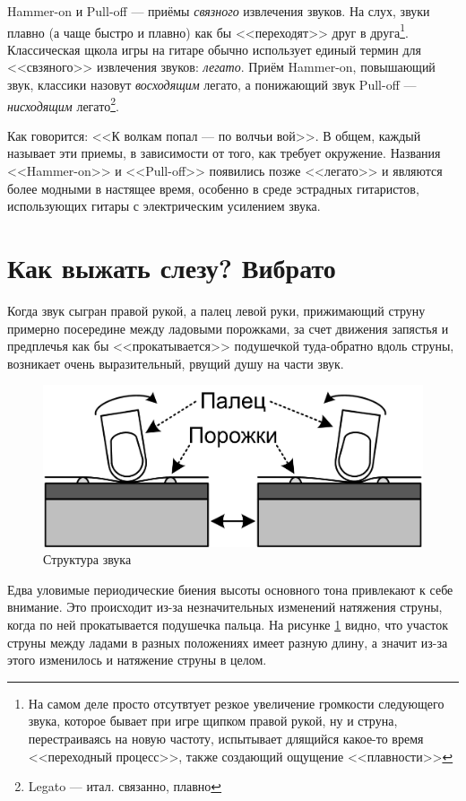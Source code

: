 Hammer-on и Pull-off --- приёмы \emph{связного} извлечения звуков. На слух, звуки плавно (а чаще быстро и плавно) как бы <<переходят>> друг в друга\footnote{На самом деле просто отсутвтует резкое увеличение громкости следующего звука, которое бывает при игре щипком правой рукой, ну и струна, перестраиваясь на новую частоту, испытывает длящийся какое-то время <<переходный процесс>>, также создающий ощущение <<плавности>>}. Классическая щкола игры на гитаре обычно использует единый термин для <<свзяного>> извлечения звуков: \emph{легато}. Приём Hammer-on, повышающий звук, классики назовут \emph{восходящим} легато, а понижающий звук Pull-off --- \emph{нисходящим} легато\footnote{Legato --- итал. связанно, плавно}. 

Как говорится: <<К волкам попал --- по волчьи вой>>. В общем, каждый называет эти приемы, в зависимости от того, как требует окружение. Названия <<Hammer-on>> и <<Pull-off>> появились позже <<легато>> и являются более модными в настящее время, особенно в среде эстрадных гитаристов, использующих гитары с электрическим усилением звука.


\section{Как выжать слезу? Вибрато}
\label{ch:tricks:vibrato}

Когда звук сыгран правой рукой, а палец левой руки, прижимающий струну примерно посередине между ладовыми порожками, за счет движения запястья и предплечья как бы <<прокатывается>> подушечкой туда-обратно вдоль струны, возникает очень выразительный, рвущий душу на части звук.  

\begin{figure}[!ht]
    \centering
    \includegraphics{fig/vibrato} 
    \caption{Структура звука}\label{fig:tricks:vibrato}
\end{figure}

Едва уловимые периодические биения высоты основного тона привлекают к себе внимание. Это происходит из-за незначительных изменений натяжения струны, когда по ней прокатывается подушечка пальца. На рисунке \ref{fig:tricks:vibrato} видно, что участок струны между ладами в разных положениях имеет разную длину, а значит из-за этого изменилось и натяжение струны в целом.


